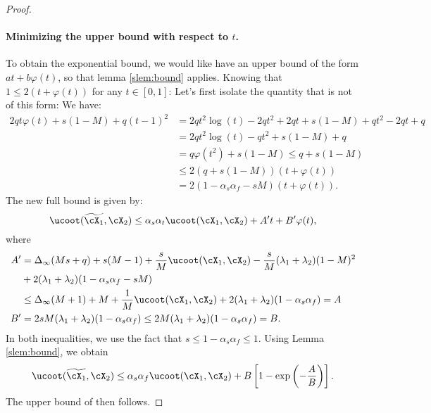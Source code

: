 \begin{proof}
    \paragraph{Minimizing the upper bound with respect to $t$.}
    To obtain the exponential bound, we would like have an upper bound of the form
    $at + b\varphi(t)$, so that lemma \ref{slem:bound} applies.
    Knowing that $1 \leq 2(t + \varphi(t))$ for any $t \in [0, 1]$:
    Let's first isolate the quantity that is not of this form:
    We have:
    \begin{equation*}
      \begin{split}
        2q t \varphi(t) + s(1 - M) + q(t-1)^2 &= 2qt^2\log(t) - 2qt^2 + 2qt + s(1-M) + qt^2 -2qt + q \\
        &=  2qt^2\log(t) - qt^2 + s(1-M) + q \\
        &= q\varphi(t^2) + s(1-M) \leq q + s(1-M) \\
        &\leq 2(q + s(1-M)) (t + \varphi(t)) \\
        &= 2(1 -\alpha_s\alpha_f - sM) (t + \varphi(t)).
      \end{split}
    \end{equation*}
    The new full bound is given by:
    \begin{equation*}
        \ucoot(\widetilde{\cX_1}, \cX_2) \leq \alpha_s\alpha_t \ucoot(\cX_1, \cX_2) + A' t + B'\varphi(t),
    \end{equation*}
    where
    \begin{equation*}
        \begin{split}
            A' &= \Delta_{\infty}(Ms + q) + s(M-1) + \frac{s}{M}\ucoot(\cX_1, \cX_2) - \frac{s}{M}(\lambda_1 + \lambda_2)(1-M)^2 \\
            &+ 2(\lambda_1 + \lambda_2) (1-\alpha_s\alpha_f - sM) \\
            & \leq \Delta_{\infty}(M + 1) + M + \frac{1}{M}\ucoot(\cX_1, \cX_2) + 2(\lambda_1 + \lambda_2) (1-\alpha_s\alpha_f) = A \\
            B' &= 2sM(\lambda_1 + \lambda_2) (1-\alpha_s\alpha_f) \leq 2M(\lambda_1 + \lambda_2) (1-\alpha_s\alpha_f) = B.
        \end{split}
    \end{equation*}
    In both inequalities, we use the fact that $s \leq 1 - \alpha_s \alpha_f \leq 1$.
    Using Lemma \ref{slem:bound}, we obtain
    \begin{equation*}
        \ucoot(\widetilde{\cX_1}, \cX_2)
        \leq \alpha_s\alpha_f \ucoot(\cX_1, \cX_2) + B \left[ 1 - \exp{ \left(- \frac{A}{B} \right) }\right].
    \end{equation*}
    The upper bound of  then follows.
  \end{proof}

